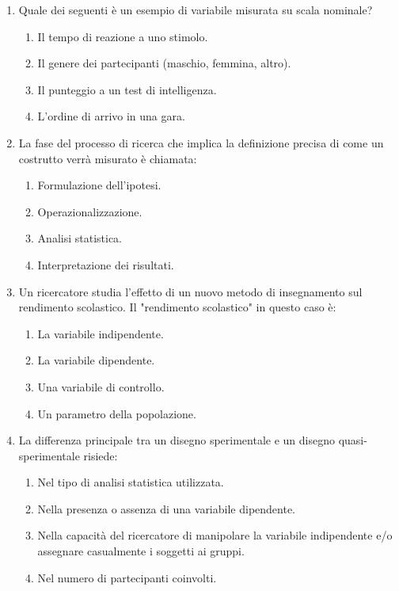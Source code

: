 \documentclass[12pt, a4paper]{article}
\begin{document}
\begin{enumerate}[resume]
    \item Quale dei seguenti è un esempio di variabile misurata su scala nominale?
    \begin{enumerate}
        \item Il tempo di reazione a uno stimolo.
        \item Il genere dei partecipanti (maschio, femmina, altro).
        \item Il punteggio a un test di intelligenza.
        \item L'ordine di arrivo in una gara.
    \end{enumerate}
    \vspace{0.3cm}

    \item La fase del processo di ricerca che implica la definizione precisa di come un costrutto verrà misurato è chiamata:
    \begin{enumerate}
        \item Formulazione dell'ipotesi.
        \item Operazionalizzazione.
        \item Analisi statistica.
        \item Interpretazione dei risultati.
    \end{enumerate}
    \vspace{0.3cm}

    \item Un ricercatore studia l'effetto di un nuovo metodo di insegnamento sul rendimento scolastico. Il "rendimento scolastico" in questo caso è:
    \begin{enumerate}
        \item La variabile indipendente.
        \item La variabile dipendente.
        \item Una variabile di controllo.
        \item Un parametro della popolazione.
    \end{enumerate}
    \vspace{0.3cm}

    \item La differenza principale tra un disegno sperimentale e un disegno quasi-sperimentale risiede:
    \begin{enumerate}
        \item Nel tipo di analisi statistica utilizzata.
        \item Nella presenza o assenza di una variabile dipendente.
        \item Nella capacità del ricercatore di manipolare la variabile indipendente e/o assegnare casualmente i soggetti ai gruppi.
        \item Nel numero di partecipanti coinvolti.
    \end{enumerate}
    \vspace{0.3cm}


\end{enumerate}
\end{document}
